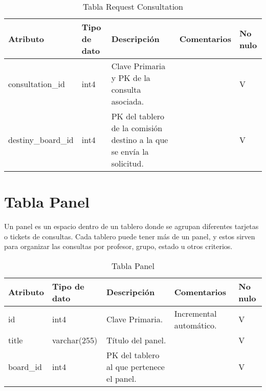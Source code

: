 \begin{table}[H]
\centering
\label{tab:req-consult}
\begin{tabular}{|p{3cm}|p{2.5cm}|p{4.5cm}|p{4cm}|p{1cm}|}
\hline
\textbf{Atributo} & \textbf{Tipo de dato}  & \textbf{Descripción} & \textbf{Comentarios} & \textbf{No nulo} \\ \hline
consultation\_id & int4 & Clave Primaria y PK de la consulta asociada. & & V \\ \hline
destiny\_board\_id & int4 &  PK del tablero de la comisión destino a la que se envía la solicitud. &  & V \\ \hline
\end{tabular}
\caption{Tabla Request Consultation}
\end{table}


\section{Tabla Panel}\label{sec:table-panel}
Un panel es un espacio dentro de un tablero donde se agrupan diferentes tarjetas o tickets de consultas. Cada tablero puede tener más de un panel, y estos sirven para organizar las consultas por profesor, grupo, estado u otros criterios.

\begin{table}[H]
\centering
\label{tab:panel}
\begin{tabular}{|p{3cm}|p{2.5cm}|p{4.5cm}|p{4cm}|p{1cm}|}
\hline
\textbf{Atributo} & \textbf{Tipo de dato}  & \textbf{Descripción} & \textbf{Comentarios} & \textbf{No nulo} \\ \hline
id & int4 & Clave Primaria. & Incremental automático. & V \\ \hline
title & varchar(255) &  Título del panel. &  & V \\ \hline
board\_id & int4 & PK del tablero al que pertenece el panel. &  & V \\ \hline
\end{tabular}
\caption{Tabla Panel}
\end{table}